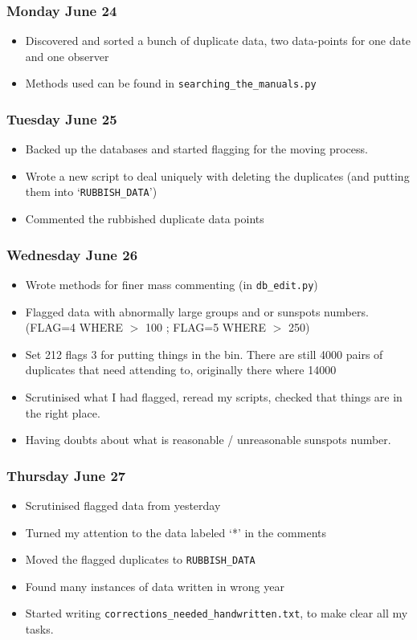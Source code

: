 \documentclass[12pt]{article}
\begin{document}
\subsubsection{Monday June 24}
\begin{itemize}
    \item Discovered and sorted a bunch of duplicate data, two data-points for one date and one observer
    \item Methods used can be found in \texttt{searching\_the\_manuals.py}
\end{itemize}
    
\subsubsection{Tuesday June 25}
\begin{itemize}
    \item Backed up the databases and started flagging for the moving process.
    \item Wrote a new script to deal uniquely with deleting the duplicates (and putting them into `\texttt{RUBBISH\_DATA}')
    \item Commented the rubbished duplicate data points
\end{itemize}
    
\subsubsection{Wednesday June 26}
\begin{itemize}
    \item Wrote methods for finer mass commenting (in \texttt{db\_edit.py})
    \item Flagged data with abnormally large groups and or sunspots numbers. (FLAG=4 WHERE $>$ 100 ; FLAG=5 WHERE $>$ 250)
    \item Set 212 flags 3 for putting things in the bin. There are still 4000 pairs of duplicates that need attending to, originally there where 14000
    \item Scrutinised what I had flagged, reread my scripts, checked that things are in the right place.
    \item Having doubts about what is reasonable / unreasonable sunspots number.
\end{itemize}
    
\subsubsection{Thursday June 27}
\begin{itemize}
    \item Scrutinised flagged data from yesterday
    \item Turned my attention to the data labeled `*' in the comments
    \item Moved the flagged duplicates to \texttt{RUBBISH\_DATA}
    \item Found many instances of data written in wrong year
    \item Started writing \texttt{corrections\_needed\_handwritten.txt}, to make clear all my tasks.
\end{itemize}
    
\end{document}
